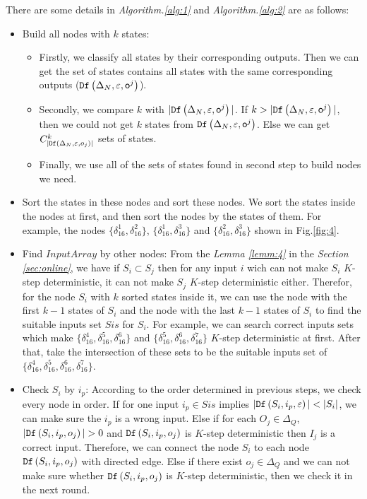 There are some details in {\em Algorithm.\ref{alg:1}} and {\em Algorithm.\ref{alg:2}} are as follows:
\begin{itemize}
\item Build all nodes with $k$ states:
\begin{itemize}
\item Firstly, we classify all states by their corresponding outputs. Then we can get the set of states contains all states with the same corresponding outputs (${\tt Df}\left(\Delta_N,\varepsilon,\mathsf{o}^{j}\right)$).
\item Secondly, we compare $k$ with $|{\tt Df}\left(\Delta_N,\varepsilon,\mathsf{o}^{j}\right)|$. If $k>|{\tt Df}\left(\Delta_N,\varepsilon,\mathsf{o}^{j}\right)|$, then we could not get $k$ states from ${\tt Df}\left(\Delta_N,\varepsilon,\mathsf{o}^{j}\right)$. Else we can get $C_{|{\tt Df}\left(\Delta_N,\varepsilon,o_j\right)|}^k$ sets of states.
\item Finally, we use all of the sets of states found in second step to build nodes we need. 
\end{itemize} 
 \item Sort the states in these nodes and sort these nodes. We sort the states inside the nodes at first, and then sort the nodes by the states of them. For example, the nodes $\{\delta_{16}^1,\delta_{16}^2\}$, $\{\delta_{16}^1,\delta_{16}^3\}$ and $\{\delta_{16}^2,\delta_{16}^3\}$ shown in Fig.\ref{fig:4}. 
  \item Find $InputArray$ by other nodes: From the {\em Lemma \ref{lemm:4}} in the {\em Section \ref{sec:online}}, we have if $S_i\subset S_j$ then for any input $i$ wich can not make $S_i$ $K$-step deterministic, it can not make $S_j$ $K$-step deterministic either. Therefor, for the node $S_i$ with $k$ sorted states inside it, we can use the node with the first $k-1$ states of $S_i$ and the node with the last $k-1$ states of $S_i$ to find the suitable inputs set $Sis$ for $S_i$. For example, we can search correct inputs sets which make $\{\delta_{16}^4,\delta_{16}^5,\delta_{16}^6\}$ and $\{\delta_{16}^5,\delta_{16}^6,\delta_{16}^7\}$ $K$-step deterministic at first. After that, take the intersection of these sets to be the suitable inputs set of $\{\delta_{16}^4,\delta_{16}^5,\delta_{16}^6,\delta_{16}^7\}$. 
  \item Check $S_i$ by $i_p$: According to the order determined in previous steps, we check every node in order. If for one input $i_p\in Sis$ implies $|\Ded\left(S_i,i_p,\varepsilon\right)|<|S_i|$, we can make sure the $i_p$ is a wrong input. Else if for each $O_j \in \Delta_Q$, $|\Ded\left(S_i,i_p,o_j\right)|>0$ and ${\tt Df}\left(S_i,i_p,o_j\right)$ is $K$-step deterministic then $I_j$ is a correct input. Therefore, we can connect the node $S_i$ to each node ${\tt Df}\left(S_i,i_p,o_j\right)$ with directed edge. Else if there exist $o_j \in \Delta_Q$ and we can not make sure whether ${\tt Df}\left(S_i,i_p,o_j\right)$ is $K$-step deterministic, then we check it in the next round. 
\end{itemize} 

